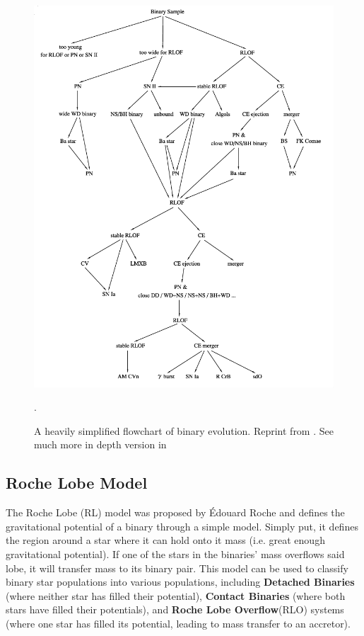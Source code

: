 \documentclass[12pt, a4paper]{article}
\begin{document}
    \vspace*{\fill}
    \begin{figure}[H]
        \centering
        \includegraphics[width=\textwidth]{figs/reused-figs/Han_BinaryEvolFlowchart.png}
        \caption{A heavily simplified flowchart of binary evolution. Reprint from \parencite{Han_2008}. See much more in depth version in \parencite{Chen_2024}}.
        \label{fig:binary_evolution_flowchart}
    \end{figure}
    \vspace*{\fill}
    \restoregeometry

    \subsection{\centering Roche Lobe Model} \label{RLModel} %
        The Roche Lobe (RL) model was proposed by Édouard Roche and defines the gravitational potential of a binary through a simple model. Simply put, it defines the region around a star where it can hold onto it mass (i.e. great enough gravitational potential). If one of the stars in the binaries' mass overflows said lobe, it will transfer mass to its binary pair. This model can be used to classify binary star populations into various populations, including \textbf{Detached Binaries} (where neither star has filled their potential), \textbf{Contact Binaries} (where both stars have filled their potentials), and \textbf{Roche Lobe Overflow}(RLO) systems (where one star has filled its potential, leading to mass transfer to an accretor).
\end{document}
